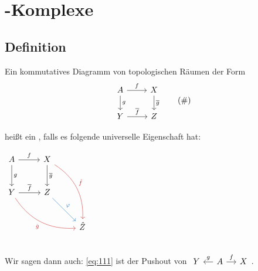 \section{\CW-Komplexe} %
\label{sec:11}

\subsection[Definition: Pushout]{Definition} %
\label{sub:111}
Ein kommutatives Diagramm von topologischen Räumen der Form
\begin{equation*}
	\begin{tikzcd}
		A \rar["f"] \dar["g"] & X \dar["\overline{g} "] \\
		Y \rar["\overline{f}"] & Z
	\end{tikzcd} \label{eq:111} \tag{\#}
\end{equation*}
\noindent\begin{minipage}{0.65\textwidth}
	heißt ein , falls es folgende universelle Eigenschaft hat: \smallskip\\
\end{minipage}
\hfill \begin{minipage}{0.3\textwidth}
	\(
		\begin{tikzcd}[sep=2.6em]
			A \rar["f"] \dar["g"] & X \dar["\overline{g}"] \arrow[ddr, "\hat{f}", bend left, Firebrick3] \\
			Y \rar["\overline{f}"] \arrow[drr, "\hat{g}"',bend right, Firebrick3] & Z  \drar["\varphi", DodgerBlue3] \\
			& & \hat{Z}
		\end{tikzcd}
	\)
\end{minipage}\\
Wir sagen dann auch: \eqref{eq:111} ist der Pushout von 
\(
	\begin{tikzcd}[sep=small]
		Y & A \rar["f"] \lar["g"']& X 
	\end{tikzcd}
\).
